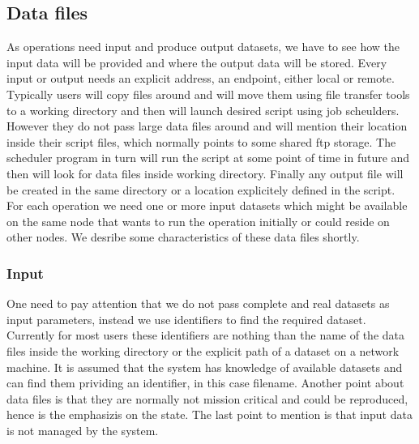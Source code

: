 \subsection{Data files}
As operations need input and produce output datasets, we have to see how the input data will be provided and where the output
data will be stored. Every input or output needs an explicit address, an endpoint, either local or remote.
Typically users will copy files around and will move them using file transfer tools to a working directory and then will
launch desired script using job scheulders. However they do not pass large data files around and will mention their location
inside their script files, which normally points to some shared ftp storage. 
The scheduler program in turn will run the script at some point of time in future and then
will look for data files inside working directory. Finally any output file will be created in the same directory or a location
explicitely defined in the script.
For each operation we need one or more input datasets which might be available on the same node that wants to run the operation
initially or could reside on other nodes. We desribe some characteristics of these data files shortly.

\subsubsection{Input}
One need to pay attention that we do not pass complete and real datasets as input parameters,
instead we use identifiers to find the required dataset. Currently for most users these identifiers are nothing
than the name of the data files inside the working directory or the explicit path of a dataset on a network machine.
It is assumed that the system has knowledge of available
datasets and can find them prividing an identifier, in this case filename. 
Another point about data files is that they are normally not mission critical and could be reproduced, hence is the emphasizis
on the state. The last point to mention is that input data is not managed by the system.




